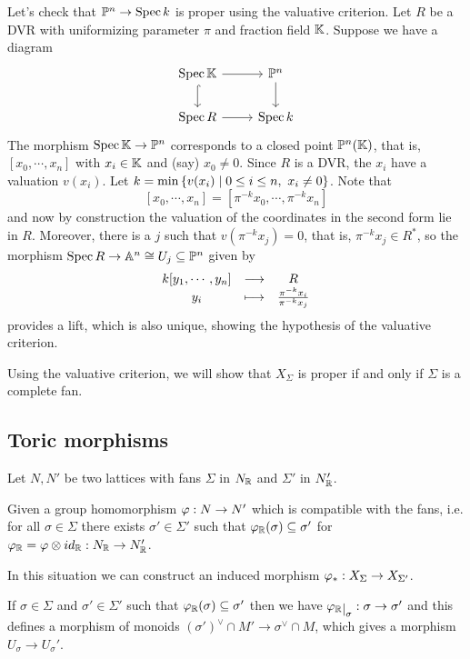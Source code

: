 \begin{example}
Let's check that $\mathbb{P}^n\to \operatorname{Spec} k$ is proper using the valuative criterion. Let $R$ be a DVR with uniformizing parameter $\pi$ and fraction field $\mathbb{K}$. Suppose we have a diagram
\[\begin{tikzcd}
	{\Spec \K} & {\Pj^n} \\
	{\Spec R} & {\Spec k}
	\arrow[from=1-1, to=1-2]
	\arrow[hook, from=1-1, to=2-1]
	\arrow[from=1-2, to=2-2]
	\arrow[from=2-1, to=2-2]
\end{tikzcd}\]
The morphism $\operatorname{Spec} \mathbb{K}\to \mathbb{P}^n$ corresponds to a closed point $\mathbb{P}^n(\mathbb{K})$, that is, $[x_0,\cdots, x_n]$ with $x_i\in \mathbb{K}$ and (say) $x_0\neq 0$. Since $R$ is a DVR, the $x_i$ have a valuation $v(x_i)$. Let $k=\min\cpa{v(x_i)\mid 0\leq i\leq n,\ x_i\neq 0}$. Note that
\[[x_0,\cdots, x_n]=[\pi^{-k}x_0,\cdots, \pi^{-k}x_n]\]
and now by construction the valuation of the coordinates in the second form lie in $R$. Moreover, there is a $j$ such that $v(\pi^{-k}x_j)=0$, that is, $\pi^{-k}x_j\in R^\ast$, so the morphism $\operatorname{Spec} R\to \mathbb{A}^n\cong U_j\subseteq \mathbb{P}^n$ given by
\[\begin{array}{ccc} {k[y_1,\cdots, y_n]} & \longrightarrow & {R}\\ {y_i} & \longmapsto & {\frac{\pi^{-k}x_i}{\pi^{-k}x_j}} \end{array}\]
provides a lift, which is also unique, showing the hypothesis of the valuative criterion.
\end{example}


Using the valuative criterion, we will show that $X_\Sigma$ is proper if and only if $\Sigma$ is a complete fan.


\subsection{Toric morphisms}

Let $N,N'$ be two lattices with fans $\Sigma$ in $N_{\mathbb{R}}$ and $\Sigma'$ in $N'_{\mathbb{R}}$.

Given a group homomorphism $\varphi:N\to N'$ which is compatible with the fans, i.e. for all $\sigma\in \Sigma$ there exists $\sigma'\in \Sigma'$ such that $\varphi_{\mathbb{R}}(\sigma)\subseteq \sigma'$ for $\varphi_{\mathbb{R}}=\varphi\otimes id_{\mathbb{R}}:N_{\mathbb{R}}\to N'_{\mathbb{R}}$.


In this situation we can construct an induced morphism $\varphi_\ast:X_\Sigma\to X_{\Sigma'}$.

If $\sigma\in \Sigma$ and $\sigma'\in \Sigma'$ such that $\varphi_{\mathbb{R}}(\sigma)\subseteq \sigma'$ then we have $\vp_\R\res{\sigma}:\sigma\to \sigma'$ and this defines a morphism of monoids $(\sigma')^\vee\cap M'\to \sigma^\vee\cap M$, which gives a morphism $U_\sigma\to U_\sigma'$.

